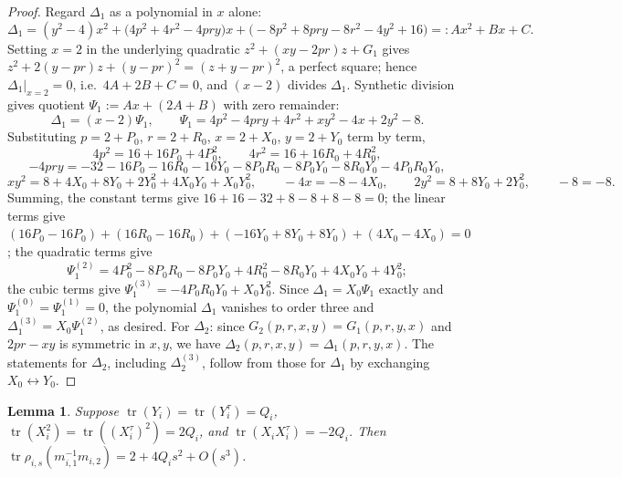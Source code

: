 \documentclass{article}
\DeclareMathOperator{\tr}{tr}
\theoremstyle{plain}
\theoremstyle{definition}
\theoremstyle{plain}
\theoremstyle{plain}
\theoremstyle{plain}
\newtheorem{lemma}[theorem]{Lemma}
\theoremstyle{remark}
\theoremstyle{remark}
\theoremstyle{plain}
\theoremstyle{plain}
\newcounter{main}
\theoremstyle{plain}
\theoremstyle{plain}
\begin{document}
\begin{proof}
Regard $\Delta_1$ as a polynomial in $x$ alone:
\begin{equation*}
	\Delta_1 = (y^2-4)x^2 + \bigl(4p^2+4r^2-4pry\bigr)x + \bigl(-8p^2+8pry-8r^2-4y^2+16\bigr) =: Ax^2+Bx+C.
\end{equation*}
Setting $x=2$ in the underlying quadratic $z^2+(xy-2pr)z+G_1$ gives $z^2+2(y-pr)z+(y-pr)^2=(z+y-pr)^2$, a perfect square; hence $\Delta_1|_{x=2}=0$, i.e.\ $4A+2B+C=0$, and $(x-2)$ divides $\Delta_1$. Synthetic division gives quotient $\Psi_1 := Ax+(2A+B)$ with zero remainder:
\begin{equation*}
	\Delta_1 = (x-2)\Psi_1, \qquad \Psi_1 = 4p^2-4pry+4r^2+xy^2-4x+2y^2-8.
\end{equation*}
Substituting $p=2+P_0$, $r=2+R_0$, $x=2+X_0$, $y=2+Y_0$ term by term,
\begin{equation*}
	4p^2 = 16+16P_0+4P_0^2, \qquad 4r^2 = 16+16R_0+4R_0^2,
\end{equation*}
\begin{equation*}
	-4pry = -32-16P_0-16R_0-16Y_0-8P_0R_0-8P_0Y_0-8R_0Y_0-4P_0R_0Y_0,
\end{equation*}
\begin{equation*}
	xy^2 = 8+4X_0+8Y_0+2Y_0^2+4X_0Y_0+X_0Y_0^2, \qquad -4x=-8-4X_0, \qquad 2y^2 = 8+8Y_0+2Y_0^2, \qquad -8=-8.
\end{equation*}
Summing, the constant terms give $16+16-32+8-8+8-8=0$; the linear terms give $(16P_0-16P_0)+(16R_0-16R_0)+(-16Y_0+8Y_0+8Y_0)+(4X_0-4X_0)=0$; the quadratic terms give
\begin{equation*}
	\Psi_1^{(2)} = 4P_0^2-8P_0R_0-8P_0Y_0+4R_0^2-8R_0Y_0+4X_0Y_0+4Y_0^2;
\end{equation*}
the cubic terms give $\Psi_1^{(3)} = -4P_0R_0Y_0+X_0Y_0^2$. Since $\Delta_1 = X_0\Psi_1$ exactly and $\Psi_1^{(0)} = \Psi_1^{(1)}=0$, the polynomial $\Delta_1$ vanishes to order three and $\Delta_1^{(3)} = X_0\Psi_1^{(2)}$, as desired. For $\Delta_2$: since $G_2(p,r,x,y) = G_1(p,r,y,x)$ and $2pr-xy$ is symmetric in $x,y$, we have $\Delta_2(p,r,x,y) = \Delta_1(p,r,y,x)$. The statements for $\Delta_2$, including $\Delta_2^{(3)}$, follow from those for $\Delta_1$ by exchanging $X_0 \leftrightarrow Y_0$.
\end{proof}

\begin{lemma}\label{lma:crossjet}
Suppose $\tr(Y_i) = \tr(Y_i^\tau) = Q_i$, $\tr(X_i^2) = \tr((X_i^\tau)^2) = 2Q_i$, and $\tr(X_iX_i^\tau) = -2Q_i$. Then $\tr\rho_{i,s}(m_{i,1}^{-1}m_{i,2}) = 2 + 4Q_is^2 + O(s^3)$. 
\end{lemma}
\end{document}
